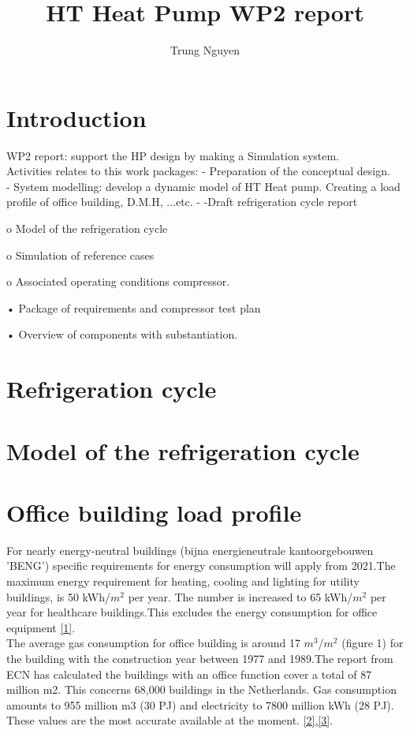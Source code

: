 \documentclass[a4paper,10pt]{article}
\title{HT Heat Pump WP2 report}
\author{Trung Nguyen}
\date{}
\begin{document}
\maketitle

\tableofcontents

\section{Introduction}
WP2 report: support the HP design by making a Simulation system.\\
Activities relates to this work packages:
- Preparation of the conceptual design.\\
- System modelling: develop a dynamic model of HT Heat pump. Creating a load profile of office building, D.M.H, ...etc.
- 
 -Draft refrigeration cycle report 

o Model of the refrigeration cycle 

o Simulation of reference cases 

o Associated operating conditions compressor. 

• Package of requirements and compressor test plan 

• Overview of components with substantiation.



\section{Refrigeration cycle}


\section{ Model of the refrigeration cycle}



\section{Office building load profile}

For nearly energy-neutral buildings (bijna energieneutrale kantoorgebouwen 'BENG') specific requirements for energy consumption will apply from 2021.The maximum energy requirement for heating, cooling and lighting for utility buildings, is 50 kWh/$m^2$ per year. The number is increased to 65 kWh/$m^2$ per year for healthcare buildings.This excludes the energy consumption for office equipment \href{https://www.energievastgoed.nl/benchmarktool/}{[1]}.\\
The average gas consumption for office building is around 17 $m^3$/$m^2$ (figure 1) for the building with the construction year between 1977 and 1989.The report from ECN has calculated the buildings with an office function cover a total of 87 million m2. This concerns 68,000 buildings in the Netherlands. Gas consumption amounts to 955 million m3 (30 PJ) and electricity to 7800 million kWh (28 PJ). These values are the most accurate available at the moment.  
\href{https://www.energievastgoed.nl/2017/02/14/benchmark-energieverbruik-gebouwen/}{[2],[3]}.
\end{document}
